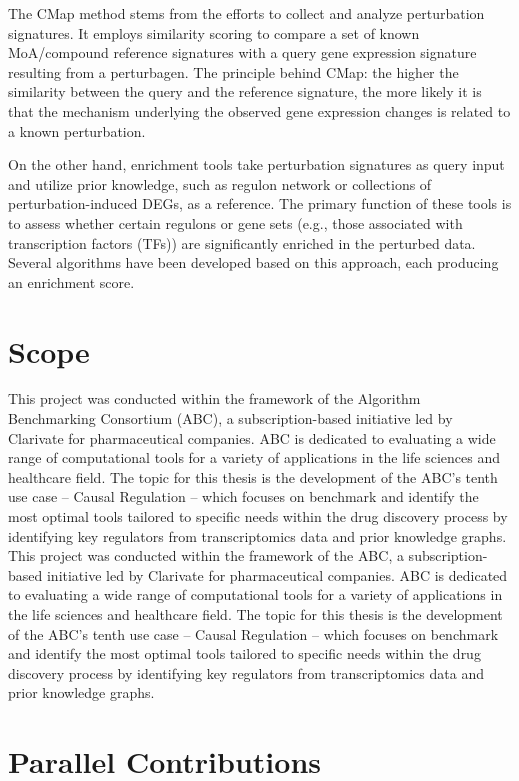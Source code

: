 The \gls{CMap} method stems from the efforts to collect and analyze perturbation signatures. It employs similarity scoring to compare a set of known MoA/compound reference signatures with a query gene expression signature resulting from a perturbagen. The principle behind CMap: the higher the similarity between the query and the reference signature, the more likely it is that the mechanism underlying the observed gene expression changes is related to a known perturbation.

On the other hand, enrichment tools take perturbation signatures as query input and utilize prior knowledge, such as regulon network or collections of perturbation-induced \gls{DEGs}, as a reference. The primary function of these tools is to assess whether certain regulons or gene sets (e.g., those associated with transcription factors (TFs)) are significantly enriched in the perturbed data. Several algorithms have been developed based on this approach, each producing an enrichment score.


\section{Scope} %
\label{sec:scope}
This project was conducted within the framework of the Algorithm Benchmarking Consortium (ABC), a subscription-based initiative led by Clarivate for pharmaceutical companies. ABC is dedicated to evaluating a wide range of computational tools for a variety of applications in the life sciences and healthcare field. The topic for this thesis is the development of the ABC’s tenth use case – Causal Regulation – which focuses on benchmark and identify the most optimal tools tailored to specific needs within the drug discovery process by identifying key regulators from transcriptomics data and prior knowledge graphs.
This project was conducted within the framework of the \gls{ABC}, a subscription-based initiative led by Clarivate for pharmaceutical companies. \gls{ABC} is dedicated to evaluating a wide range of computational tools for a variety of applications in the life sciences and healthcare field. The topic for this thesis is the development of the ABC’s tenth use case – Causal Regulation – which focuses on benchmark and identify the most optimal tools tailored to specific needs within the drug discovery process by identifying key regulators from transcriptomics data and prior knowledge graphs.

\section{Parallel Contributions} %
\label{sec:parallel_contributions}


